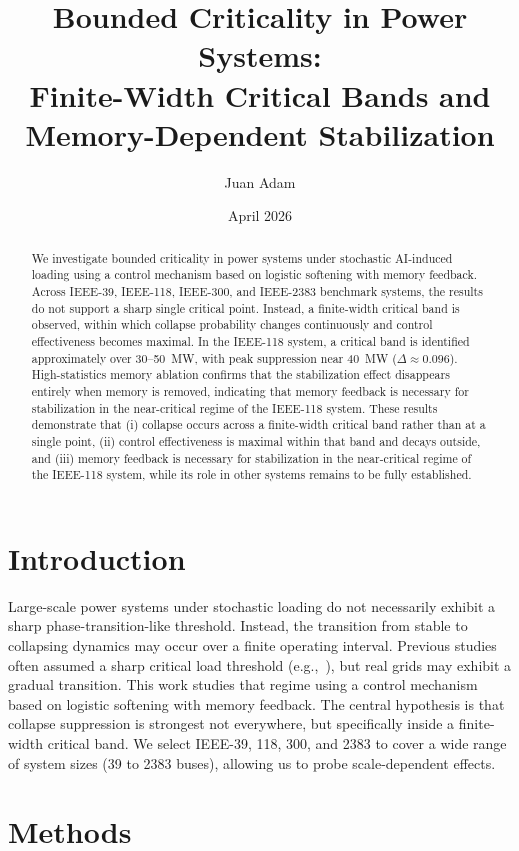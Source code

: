 \documentclass[11pt]{article}
\title{Bounded Criticality in Power Systems:\\
Finite-Width Critical Bands and Memory-Dependent Stabilization}
\author{Juan Adam}
\date{April 2026}
\begin{document}
\maketitle

\begin{abstract}
We investigate bounded criticality in power systems under stochastic AI-induced loading using a control mechanism based on logistic softening with memory feedback. Across IEEE-39, IEEE-118, IEEE-300, and IEEE-2383 benchmark systems, the results do not support a sharp single critical point. Instead, a finite-width critical band is observed, within which collapse probability changes continuously and control effectiveness becomes maximal. In the IEEE-118 system, a critical band is identified approximately over 30--50~MW, with peak suppression near 40~MW ($\Delta \approx 0.096$). High-statistics memory ablation confirms that the stabilization effect disappears entirely when memory is removed, indicating that memory feedback is necessary for stabilization in the near-critical regime of the IEEE-118 system. These results demonstrate that (i) collapse occurs across a finite-width critical band rather than at a single point, (ii) control effectiveness is maximal within that band and decays outside, and (iii) memory feedback is necessary for stabilization in the near-critical regime of the IEEE-118 system, while its role in other systems remains to be fully established.
\end{abstract}

\section{Introduction}

Large-scale power systems under stochastic loading do not necessarily exhibit a sharp phase-transition-like threshold. Instead, the transition from stable to collapsing dynamics may occur over a finite operating interval. Previous studies often assumed a sharp critical load threshold (e.g.,~\cite{Dobson2004}), but real grids may exhibit a gradual transition. This work studies that regime using a control mechanism based on logistic softening with memory feedback. The central hypothesis is that collapse suppression is strongest not everywhere, but specifically inside a finite-width critical band. We select IEEE-39, 118, 300, and 2383 to cover a wide range of system sizes (39 to 2383 buses), allowing us to probe scale-dependent effects.

\section{Methods}
\end{document}
